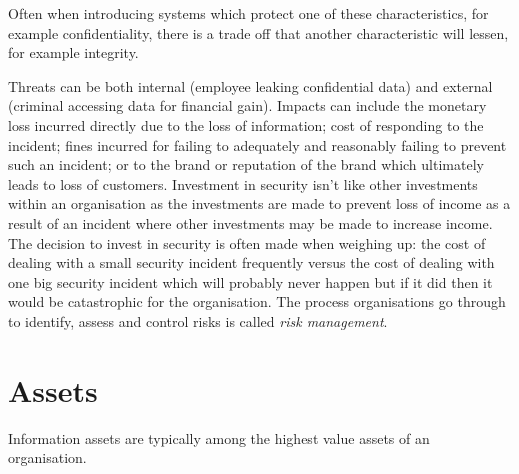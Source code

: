 

Often when introducing systems which protect one of these characteristics, for example confidentiality, there is a trade off that another characteristic will lessen, for example integrity.

Threats can be both internal (employee leaking confidential data) and external (criminal accessing data for financial gain).
Impacts can include the monetary loss incurred directly due to the loss of information; cost of responding to the incident; fines incurred for failing to adequately and reasonably failing to prevent such an incident; or to the brand or reputation of the brand which ultimately leads to loss of customers.
Investment in security isn't like other investments within an organisation as the investments are made to prevent loss of income as a result of an incident where other investments may be made to increase income. The decision to invest in security is often made when weighing up: the cost of dealing with a small security incident frequently versus the cost of dealing with one big security incident which will probably never happen but if it did then it would be catastrophic for the organisation. The process organisations go through to identify, assess and control risks is called \textit{risk management}. 

\section*{Assets}
Information assets are typically among the highest value assets of an organisation. 

